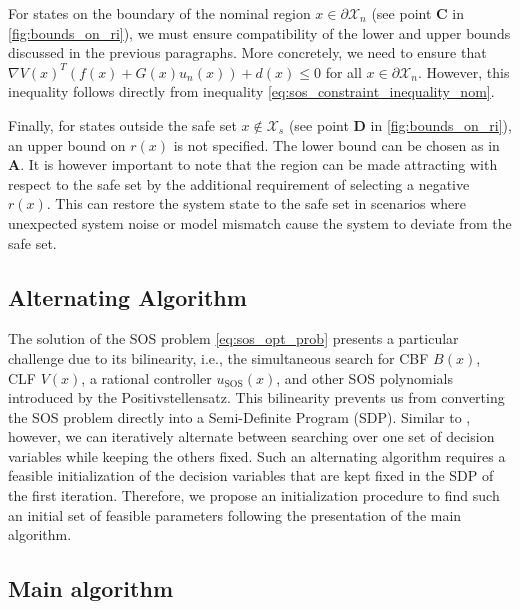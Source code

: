    For states on the boundary of the nominal region $x \in \partial \mathcal X_n$ (see point \textbf{C} in \cref{fig:bounds_on_ri}), we must ensure compatibility of the lower and upper bounds discussed in the previous paragraphs.
   More concretely, we need to ensure that $\nabla V(x)^T \left ( f(x) + G(x) u_{n}(x) \right ) + d(x) \leq 0$ for all $x \in \partial \mathcal X_n$.
   However, this inequality follows directly from inequality \cref{eq:sos_constraint_inequality_nom}.

   Finally, for states outside the safe set $x \notin \mathcal X_s$ (see point \textbf{D} in \cref{fig:bounds_on_ri}), an upper bound on $r(x)$ is not specified.
   The lower bound can be chosen as in \textbf{A}.
   It is however important to note that the region can be made attracting with respect to the safe set by the additional requirement of selecting a negative $r(x)$.
   This can restore the system state to the safe set in scenarios where unexpected system noise or model mismatch cause the system to deviate from the safe set.



\subsection{Alternating Algorithm} \label{sec:algorithm}

The solution of the SOS problem \cref{eq:sos_opt_prob} presents a particular challenge due to its bilinearity, i.e., the simultaneous search for CBF $B(x)$, CLF $V(x)$, a rational controller $u_\text{SOS}(x)$, and other SOS polynomials introduced by the Positivstellensatz.
This bilinearity prevents us from converting the SOS problem directly into a Semi-Definite Program (SDP).
Similar to \cite{TanPackard:04,schneeberger2023sos}, however, we can iteratively alternate between searching over one set of decision variables while keeping the others fixed.
Such an alternating algorithm requires a feasible initialization of the decision variables that are kept fixed in the SDP of the first iteration.
Therefore, we propose an initialization procedure to find such an initial set of feasible parameters following the presentation of the main algorithm.



\subsection{Main algorithm} \label{sec:main_algorithm}


